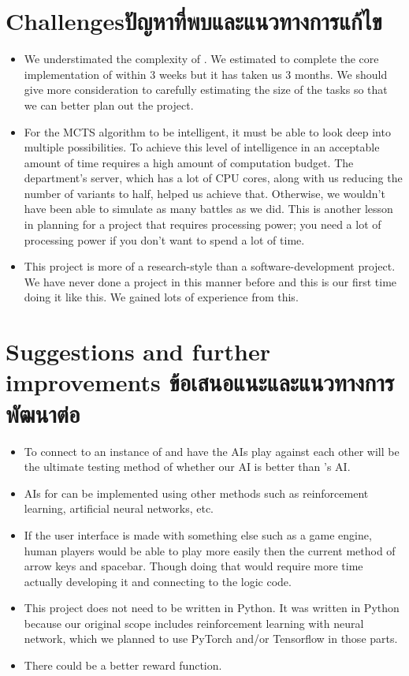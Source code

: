 \section{\ifenglish Challenges\else ปัญหาที่พบและแนวทางการแก้ไข\fi}

\begin{itemize}
    \item We understimated the complexity of \RootB{}. We estimated to complete the core implementation of \RootOurs{} within 3 weeks but it has taken us 3 months. We should give more consideration to carefully estimating the size of the tasks so that we can better plan out the project.
    \item For the MCTS algorithm to be intelligent, it must be able to look deep into multiple possibilities. To achieve this level of intelligence in an acceptable amount of time requires a high amount of computation budget. The department's server, which has a lot of CPU cores, along with us reducing the number of variants to half, helped us achieve that. Otherwise, we wouldn't have been able to simulate as many battles as we did. This is another lesson in planning for a project that requires processing power; you need a lot of processing power if you don't want to spend a lot of time.
    \item This project is more of a research-style than a software-development project. We have never done a project in this manner before and this is our first time doing it like this. We gained lots of experience from this.
\end{itemize}

\section{\ifenglish%
Suggestions and further improvements
\else%
ข้อเสนอแนะและแนวทางการพัฒนาต่อ
\fi
}

\begin{itemize}
    \item To connect \RootAI{} to an instance of \RootV{} and have the AIs play against each other will be the ultimate testing method of whether our AI is better than \RootV{}'s AI. 
    \item AIs for \RootB{} can be implemented using other methods such as reinforcement learning, artificial neural networks, etc.
    \item If the user interface is made with something else such as a game engine, human players would be able to play \RootOurs{} more easily then the current method of arrow keys and spacebar. Though doing that would require more time actually developing it and connecting to the logic code.
    \item This project does not need to be written in Python. It was written in Python because our original scope includes reinforcement learning with neural network, which we planned to use PyTorch and/or Tensorflow in those parts.
    \item There could be a better reward function.
\end{itemize}

